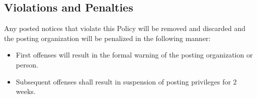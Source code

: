 \subsection{Violations and Penalties}

Any posted notices that violate this Policy will be removed and discarded and the posting organization  will be penalized in the following manner: 
\begin{itemize}
    \item First offenses will result in the formal warning of the posting organization or person.
    \item Subsequent offenses shall result in suspension of posting privileges for 2 weeks.
\end{itemize}
